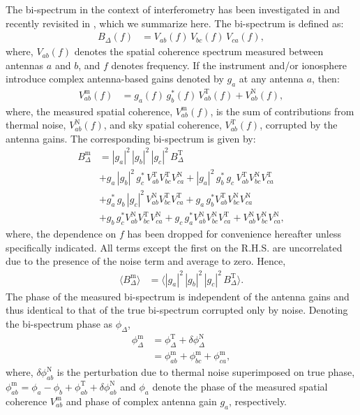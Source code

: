 \documentclass[
reprint,
superscriptaddress,
amsmath,
amssymb,
aps,
prd
]{revtex4-1}
\begin{document}
The bi-spectrum in the context of interferometry has been investigated in \cite{jen58,kul89,tay99,tho01} and recently revisited in \cite{car18}, which we summarize here. The bi-spectrum is defined as:
\begin{align}
  B_\Delta(f) &= V_{ab}(f)\,V_{bc}(f)\,V_{ca}(f),
\end{align}
where, $V_{ab}(f)$ denotes the spatial coherence spectrum measured between antennas $a$ and $b$, and $f$ denotes frequency. If the instrument and/or ionosphere introduce complex antenna-based gains denoted by $g_a$ at any antenna $a$, then: 
\begin{align}\label{eqn:vis-antgains}
  V_{ab}^\textrm{m}(f) &= g_a(f)\, g_b^*(f)\, V_{ab}^\textrm{T}(f) + V_{ab}^\textrm{N}(f),
\end{align}
where, the measured spatial coherence, $V_{ab}^\textrm{m}(f)$, is the sum of contributions from thermal noise, $V_{ab}^\textrm{N}(f)$, and sky spatial coherence, $V_{ab}^\textrm{T}(f)$, corrupted by the antenna gains. The corresponding bi-spectrum is given by:
\begin{align}\label{eqn:bispectrum-terms}
  B_\Delta^\textrm{m} &= |g_a|^2\, |g_b|^2\, |g_c|^2\, B_\Delta^\textrm{T} \\
  &+ g_a\,|g_b|^2\,g_c^*\,V_{ab}^\textrm{T}V_{bc}^\textrm{T}V_{ca}^\textrm{N} + |g_a|^2\,g_b^*\,g_c\,V_{ab}^\textrm{T}V_{bc}^\textrm{N}V_{ca}^\textrm{T} \nonumber \\
  &+ g_a^*\,g_b\,|g_c|^2\,V_{ab}^\textrm{N}V_{bc}^\textrm{T}V_{ca}^\textrm{T} + g_a\,g_b^*V_{ab}^\textrm{T}V_{bc}^\textrm{N}V_{ca}^\textrm{N} \nonumber \\
  &+ g_b\,g_c^*V_{ab}^\textrm{N}V_{bc}^\textrm{T}V_{ca}^\textrm{N} + g_c\,g_a^*V_{ab}^\textrm{N}V_{bc}^\textrm{N}V_{ca}^\textrm{T} + V_{ab}^\textrm{N}V_{bc}^\textrm{N}V_{ca}^\textrm{N}, \nonumber 
\end{align}
where, the dependence on $f$ has been dropped for convenience hereafter unless specifically indicated. All terms except the first on the R.H.S. are uncorrelated due to the presence of the noise term and average to zero. Hence, 
\begin{align}
  \langle B_\Delta^\textrm{m}\rangle &= \langle |g_a|^2\, |g_b|^2\, |g_c|^2\, B_\Delta^\textrm{T}\rangle. \label{eqn:closure-asymptotic}
\end{align}
The phase of the measured bi-spectrum is independent of the antenna gains and thus identical to that of the true bi-spectrum corrupted only by noise. Denoting the bi-spectrum phase as $\phi_\Delta$, 
\begin{align}
  \phi_\Delta^\textrm{m} &= \phi_\Delta^\textrm{T} + \delta\phi_\Delta^\textrm{N} \label{eqn:cpphase-sum-sky-noise} \\
  &= \phi_{ab}^\textrm{m} + \phi_{bc}^\textrm{m} + \phi_{ca}^\textrm{m} \label{eqn:cpphase-sum-of-visphases},
\end{align}
where, $\delta\phi_{ab}^\textrm{N}$ is the perturbation due to thermal noise superimposed on true phase, $\phi_{ab}^\textrm{m} = \phi_a - \phi_b + \phi_{ab}^\textrm{T} + \delta\phi_{ab}^\textrm{N}$ and $\phi_a$ denote the phase of the measured spatial coherence $V_{ab}^\textrm{m}$ and phase of complex antenna gain $g_a$, respectively. 
\end{document}
